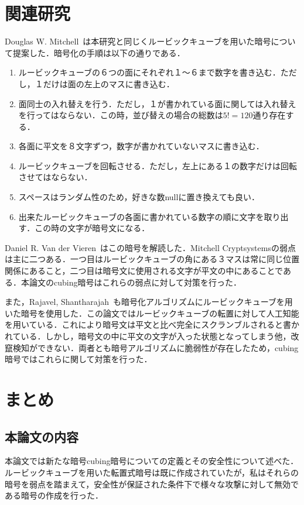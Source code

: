 \documentclass[a4j,titlepage]{jsarticle}
\begin{document}
\section{関連研究}
Douglas W. Mitchell~\cite{Mitchell}は本研究と同じくルービックキューブを用いた暗号について提案した．暗号化の手順は以下の通りである．
\begin{enumerate}
  \item ルービックキューブの６つの面にそれぞれ１〜６まで数字を書き込む．ただし，１だけは面の左上のマスに書き込む．
  \item 面同士の入れ替えを行う．ただし，１が書かれている面に関しては入れ替えを行ってはならない．この時，並び替えの場合の総数は\(5!=120\)通り存在する．
  \item 各面に平文を８文字ずつ，数字が書かれていないマスに書き込む．
  \item ルービックキューブを回転させる．ただし，左上にある１の数字だけは回転させてはならない．
  \item スペースはランダム性のため，好きな数nullに置き換えても良い．
  \item 出来たルービックキューブの各面に書かれている数字の順に文字を取り出す．この時の文字が暗号文になる．
\end{enumerate}
Daniel R. Van der Vieren~\cite{Trans-Composite Cipher}はこの暗号を解読した．Mitchell Cryptsystemsの弱点は主に二つある．一つ目はルービックキューブの角にある３マスは常に同じ位置関係にあること，二つ目は暗号文に使用される文字が平文の中にあることである．本論文のcubing暗号はこれらの弱点に対して対策を行った．

また，Rajavel, Shantharajah~\cite{Scrambling algorithm}も暗号化アルゴリズムにルービックキューブを用いた暗号を使用した．この論文ではルービックキューブの転置に対して人工知能を用いている．これにより暗号文は平文と比べ完全にスクランブルされると書かれている．しかし，暗号文の中に平文の文字が入った状態となってしまう他，改竄検知ができない．両者とも暗号アルゴリズムに脆弱性が存在したため，cubing暗号ではこれらに関して対策を行った．

\section{まとめ}

\subsection{本論文の内容}
本論文では新たな暗号cubing暗号についての定義とその安全性について述べた．ルービックキューブを用いた転置式暗号は既に作成されていたが，私はそれらの暗号を弱点を踏まえて，安全性が保証された条件下で様々な攻撃に対して無効である暗号の作成を行った．
\end{document}
